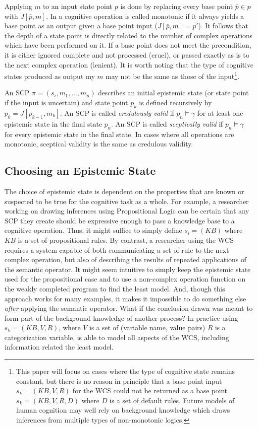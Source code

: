 \documentclass{article}
\begin{document}
Applying $m$ to an input state point $p$ is done by replacing every base point $\bar{p} \in p$ with $J[\bar{p},m]$. In a cognitive operation is called monotonic if it always yields a base point as an output given a base point input ($J[\bar{p},m]=\bar{p'}$). It follows that the depth of a state point is directly related to the number of complex operations which have been performed on it. If a base point does not meet the precondition, it is either ignored complete and not processed (cruel), or passed exactly as is to the next complex operation (lenient). It is worth noting that the type of cognitive states produced as output my $m$ may not be the same as those of the input\footnote{This paper will focus on cases where the type of cognitive state remains constant, but there is no reason in principle that a base point input $s_k = (KB,V,R)$ for the WCS could not be returned as a base point $s_k = (KB,V,R,D)$ where $D$ is a set of default rules. Future models of human cognition may well rely on background knowledge which draws inferences from multiple types of non-monotonic logics.}.

An SCP $\pi=(s_i,m_1,...,m_n)$ describes an initial epistemic state (or state point if the input is uncertain) and state point $p_k$ is defined recursively by $p_k = J[p_{k-1},m_k]$. An SCP is called \textit{credulously valid} if $p_n \models \gamma$ for at least one epistemic state in the final state $p_n$. An SCP is called \textit{sceptically valid} if $p_n \models \gamma$ for every epistemic state in the final state. In cases where all operations are monotonic, sceptical validity is the same as credulous validity.


\subsection{Choosing an Epistemic State}
The choice of epistemic state is dependent on the properties that are known or suspected to be true for the cognitive task as a whole. For example, a researcher working on drawing inferences using Propositional Logic can be certain that any SCP they create should be expressive enough to pass a knowledge base to a cognitive operation. Thus, it might suffice to simply define $s_i=(KB)$ where $KB$ is a set of propositional rules. By contrast, a researcher using the WCS requires a system capable of both communicating a set of rule to the next complex operation, but also of describing the results of repeated applications of the semantic operator. It might seem intuitive to simply keep the epistemic state used for the propositional case and to use a non-complex operation function on the weakly completed program to find the least model. And, though this approach works for many examples, it makes it impossible to do something else \textit{after} applying the semantic operator. What if the conclusion drawn was meant to form part of the background knowledge of another process? In practice using $s_k=(KB,V, R)$, where $V$ is a set of (variable name, value pairs) $R$ is a categorization variable, is able to model all aspects of the WCS, including information related the least model. 
\end{document}
